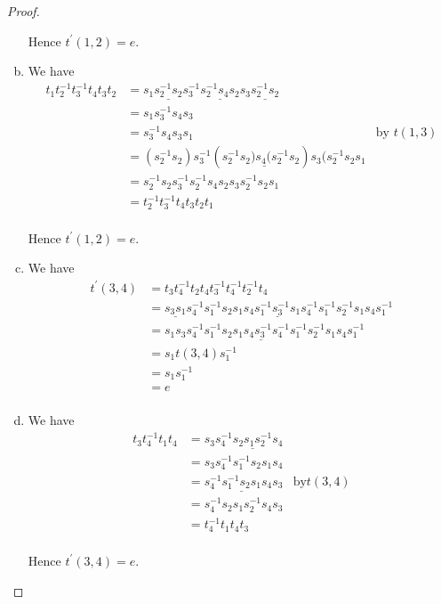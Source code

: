 \documentclass[11pt]{amsart}
\theoremstyle{definition}
\begin{document}
\begin{proof}
\begin{enumerate}[a)]
\noindent Hence $t^\prime(1,2) = e$.

\item We have
\begin{align*}
t_1t_2^{-1}t_3^{-1}t_4t_3t_2 &= s_1\underline{s_2^{-1}s_2}s_3^{-1}\underline{s_2^{-1}s_4s_2}s_3 \underline{s_2^{-1}s_2}\\
&= s_1s_3^{-1}s_4s_3\\
&= s_3^{-1}s_4s_3s_1 &\text{by } t(1,3)\\
&= (s_2^{-1}s_2)s_3^{-1}(s_2^{-1}\underline{s_2)s_4(s_2^{-1}}s_2)s_3(s_2^{-1}s_2s_1\\
&= s_2^{-1}s_2s_3^{-1}s_2^{-1}s_4s_2s_3s_2^{-1}s_2s_1\\
&= t_2^{-1}t_3^{-1}t_4t_3t_2t_1\\
\end{align*}

\noindent Hence $t^\prime(1,2) = e$.

\item We have
\begin{align*}
t^\prime(3,4) &= t_3t_4^{-1}t_2t_4t_3^{-1}t_4^{-1}t_2^{-1}t_4\\
&= \underline{s_3s_1}s_4^{-1}s_1^{-1}s_2s_1s_4\underline{s_1^{-1}s_3^{-1}s_1}s_4^{-1}s_1^{-1}s_2^{-1}s_1s_4s_1^{-1}\\
&= s_1\underline{s_3s_4^{-1}s_1^{-1}s_2s_1s_4s_3^{-1}s_4^{-1}s_1^{-1}s_2^{-1}s_1s_4}s_1^{-1}\\
&= s_1t(3,4)s_1^{-1}\\
&= s_1s_1^{-1}\\
&= e\\
\end{align*}

\item We have
\begin{align*}
t_3t_4^{-1}t_1t_4 &= s_3s_4^{-1}\underline{s_2s_1s_2^{-1}}s_4\\
&= s_3s_4^{-1}s_1^{-1}s_2s_1s_4\\
&= s_4^{-1}\underline{s_1^{-1}s_2s_1}s_4s_3 &\text{by} t(3,4)\\
&= s_4^{-1}s_2s_1s_2^{-1}s_4s_3\\
&= t_4^{-1}t_1t_4t_3\\
\end{align*}

\noindent Hence $t^\prime(3,4) = e$.


\end{enumerate}
\end{proof}
\end{document}
